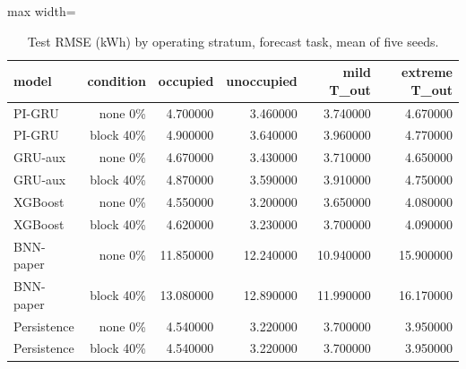 \begin{table}[H]
\centering\small
\caption{Test RMSE (kWh) by operating stratum, forecast task, mean of five seeds.}\label{tab:strata_forecast}
\begin{adjustbox}{max width=\textwidth}
\begin{tabular}{lrrrrr}
\toprule
model & condition & occupied & unoccupied & mild T\_out & extreme T\_out \\
\midrule
PI-GRU & none 0\% & 4.700000 & 3.460000 & 3.740000 & 4.670000 \\
PI-GRU & block 40\% & 4.900000 & 3.640000 & 3.960000 & 4.770000 \\
GRU-aux & none 0\% & 4.670000 & 3.430000 & 3.710000 & 4.650000 \\
GRU-aux & block 40\% & 4.870000 & 3.590000 & 3.910000 & 4.750000 \\
XGBoost & none 0\% & 4.550000 & 3.200000 & 3.650000 & 4.080000 \\
XGBoost & block 40\% & 4.620000 & 3.230000 & 3.700000 & 4.090000 \\
BNN-paper & none 0\% & 11.850000 & 12.240000 & 10.940000 & 15.900000 \\
BNN-paper & block 40\% & 13.080000 & 12.890000 & 11.990000 & 16.170000 \\
Persistence & none 0\% & 4.540000 & 3.220000 & 3.700000 & 3.950000 \\
Persistence & block 40\% & 4.540000 & 3.220000 & 3.700000 & 3.950000 \\
\bottomrule
\end{tabular}
\end{adjustbox}
\end{table}
